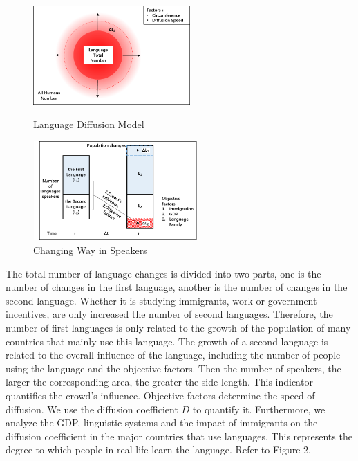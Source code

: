 \documentclass{mcmthesis}
\begin{document}
    \begin{figure}[h]
      \begin{minipage}[t]{0.5\linewidth}
      \centering
      \includegraphics[height=3.8cm,width=6cm]{p1.png}%
      \caption{Language Diffusion Model}
      \label{p1}
      \end{minipage}
      \begin{minipage}[t]{0.5\linewidth}
      \centering
      \includegraphics[height=3.8cm,width=6.3cm]{p2.png}%
      \caption{Changing Way in Speakers}
      \label{p2}
      \end{minipage}
    \end{figure}


    The total number of language changes is divided into two parts, one is the number of changes in the first language, another is the number of changes in the second language.
    Whether it is studying immigrants, work or government incentives, are only increased the number of second languages.
    Therefore, the number of first languages is only related to the growth of the population of many countries that mainly use this language.
    The growth of a second language is related to the overall influence of the language, including the number of people using the language and the objective factors.
    Then the number of speakers, the larger the corresponding area, the greater the side length.
    This indicator quantifies the crowd's influence.
    Objective factors determine the speed of diffusion.
    We use the diffusion coefficient $D$ to quantify it.
    Furthermore, we analyze the GDP, linguistic systems and the impact of immigrants on the diffusion coefficient in the major countries that use languages.
    This represents the degree to which people in real life learn the language.
    Refer to Figure 2.
\end{document}

